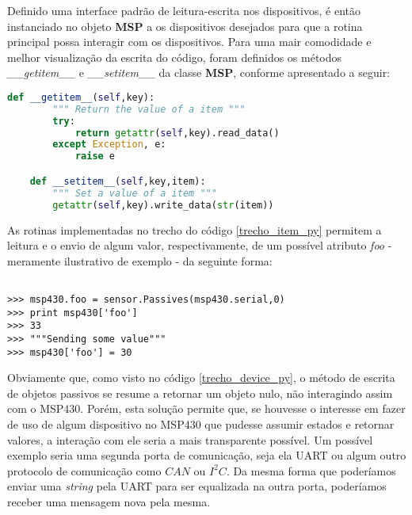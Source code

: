 Definido uma interface padrão de leitura-escrita nos dispositivos, é então instanciado no objeto \textbf{MSP} a os dispositivos desejados para que a rotina principal possa interagir com os dispositivos. Para uma mair comodidade e melhor visualização da escrita do código, foram definidos os métodos \textit{\_\_getitem\_\_} e \textit{\_\_setitem\_\_} da classe \textbf{MSP}, conforme apresentado a seguir:

\begin{lstlisting}[language=Python,caption={Declaração dos métodos de leitura e escrita de item},label=trecho_item_py]
    def __getitem__(self,key):
        """ Return the value of a item """
        try:
            return getattr(self,key).read_data()
        except Exception, e:
            raise e

    def __setitem__(self,key,item):
        """ Set a value of a item """
        getattr(self,key).write_data(str(item))
\end{lstlisting}

As rotinas implementadas no trecho do código \ref{trecho_item_py} permitem a leitura e o envio de algum valor, respectivamente, de um possível atributo \textit{foo} - meramente ilustrativo de exemplo - da seguinte forma:

\begin{lstlisting}[frame=none,numbers=none]  % Start your code-block

>>> msp430.foo = sensor.Passives(msp430.serial,0)
>>> print msp430['foo']
>>> 33
>>> """Sending some value"""
>>> msp430['foo'] = 30
\end{lstlisting}

	Obviamente que, como visto no código \ref{trecho_device_py}, o método de escrita de objetos passivos se resume a retornar um objeto nulo, não interagindo assim com o MSP430. Porém, esta solução permite que, se houvesse o interesse em fazer de uso de algum dispositivo no MSP430 que pudesse assumir estados e retornar valores, a interação com ele seria a mais transparente possível. Um possível exemplo seria uma segunda porta de comunicação, seja ela UART ou algum outro protocolo de comunicação como $CAN$ ou $I^2C$. Da mesma forma que poderíamos enviar uma \textit{string} pela UART para ser equalizada na outra porta, poderíamos receber uma mensagem nova pela mesma.

